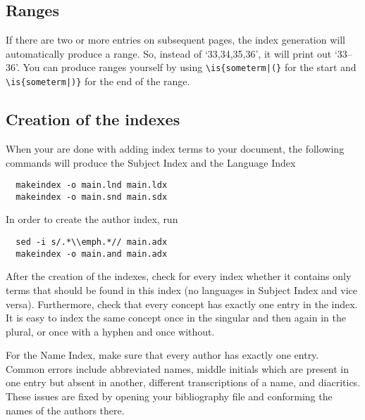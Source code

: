 \subsection{Ranges}
If there are two or more entries on subsequent pages, the index generation will automatically produce a range. So, instead of `33,34,35,36', it will print out `33--36'. You can produce ranges yourself by using \verb+\is{someterm|(}+ for the start and  \verb+\is{someterm|)}+ for the end of the range. 


\subsection{Creation of the indexes}
When your are done with adding index terms to your document, the following commands will produce the Subject Index and the Language Index
\begin{verbatim}
  makeindex -o main.lnd main.ldx
  makeindex -o main.snd main.sdx
\end{verbatim}

In order to create the author index, run

\begin{verbatim}
  sed -i s/.*\\emph.*// main.adx  
  makeindex -o main.and main.adx
\end{verbatim}

 

\largerpage
After the creation of the indexes, check for every index whether it contains only terms that should be found in this index (no languages in Subject Index and vice versa). Furthermore, check that every concept has exactly one entry in the index. It is easy to index the same concept once in the singular and then again in the plural, or once with a hyphen and once without. 

For the Name Index, make sure that every author has exactly one entry. Common errors include abbreviated names, middle initials which are present in one entry but absent in another, different transcriptions of a name, and diacritics. These issues are fixed by opening your bibliography file and conforming the names of the authors there.

